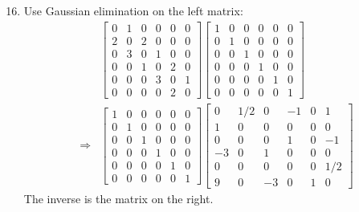 \documentclass[a4paper, 12pt]{article}
\begin{document}
\begin{enumerate}
		\setcounter{enumi}{15}
		\item Use Gaussian elimination on the left matrix:
		\begin{align*}
		&\left[ \begin{array}{cccccc}
		0 & 1 & 0 & 0 & 0 & 0 \\
		2 & 0 & 2 & 0 & 0 & 0 \\
		0 & 3 & 0 & 1 & 0 & 0 \\
		0 & 0 & 1 & 0 & 2 & 0 \\
		0 & 0 & 0 & 3 & 0 & 1 \\
		0 & 0 & 0 & 0 & 2 & 0
		\end{array} \right]
		\left[ \begin{array}{cccccc}
		1 & 0 & 0 & 0 & 0 & 0 \\
		0 & 1 & 0 & 0 & 0 & 0 \\
		0 & 0 & 1 & 0 & 0 & 0 \\
		0 & 0 & 0 & 1 & 0 & 0 \\
		0 & 0 & 0 & 0 & 1 & 0 \\
		0 & 0 & 0 & 0 & 0 & 1
		\end{array} \right] \\
		\Rightarrow &\left[ \begin{array}{cccccc}
		1 & 0 & 0 & 0 & 0 & 0 \\
		0 & 1 & 0 & 0 & 0 & 0 \\
		0 & 0 & 1 & 0 & 0 & 0 \\
		0 & 0 & 0 & 1 & 0 & 0 \\
		0 & 0 & 0 & 0 & 1 & 0 \\
		0 & 0 & 0 & 0 & 0 & 1
		\end{array} \right]
		\left[ \begin{array}{cccccc}
		0 & 1/2 & 0 & -1 & 0 & 1 \\
		1 & 0 & 0 & 0 & 0 & 0 \\
		0 & 0 & 0 & 1 & 0 & -1 \\
		-3 & 0 & 1 & 0 & 0 & 0 \\
		0 & 0 & 0 & 0 & 0 & 1/2 \\
		9 & 0 & -3 & 0 & 1 & 0
		\end{array} \right]
		\end{align*}
		The inverse is the matrix on the right.
	\end{enumerate}
\end{document}
